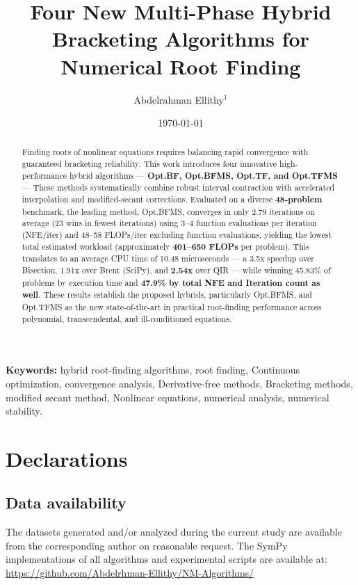 \documentclass[amsmath, amssymb, aps]{revtex4-2}
\begin{document}
\pagestyle{plain}

\title{Four New Multi-Phase Hybrid Bracketing Algorithms for Numerical Root Finding }

\author{Abdelrahman Ellithy$^{1}$}

\date{\today}

\begin{abstract}
Finding roots of nonlinear equations requires balancing rapid convergence with guaranteed bracketing reliability. This work introduces four innovative high-performance hybrid algorithms — \textbf{Opt.BF, Opt.BFMS, Opt.TF, and Opt.TFMS} — These methods systematically combine robust interval contraction with accelerated interpolation and modified-secant corrections. Evaluated on a diverse \textbf{48-problem} benchmark, the leading method, Opt.BFMS, converges in only 2.79 iterations on average (23 wins in fewest iterations) using 3–4 function evaluations per iteration (NFE/iter) and 48–58 FLOPs/iter excluding function evaluations, yielding the lowest total estimated workload (approximately \textbf{401–650 FLOPs} per problem). This translates to an average CPU time of 10.48 microseconds — a 3.5x speedup over Bisection, 1.91x over Brent (SciPy), and \textbf{2.54x} over QIR — while winning 45.83\% of problems by execution time and \textbf{47.9\% by total NFE and Iteration count as well}. These results establish the proposed hybrids, particularly Opt.BFMS, and Opt.TFMS as the new state-of-the-art in practical root-finding performance across polynomial, transcendental, and ill-conditioned equations.
\end{abstract}


\maketitle

\noindent\textbf{Keywords:} hybrid root-finding algorithms, root finding, Continuous optimization, convergence analysis, Derivative-free methods, Bracketing methods, modified secant method, Nonlinear equations, numerical analysis, numerical stability.

\section{Declarations}\label{sec:declaration}

\subsection{Data availability}\label{sec:dataavailability}
The datasets generated and/or analyzed during the current study are available from the corresponding author on reasonable request. The SymPy implementations of all algorithms and experimental scripts are available at: \url{https://github.com/Abdelrhman-Ellithy/NM-Algorithms/}
\end{document}
